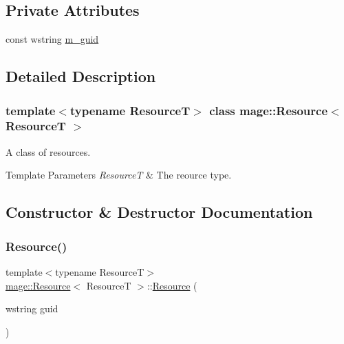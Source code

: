 \subsection*{Private Attributes}
\begin{DoxyCompactItemize}
\item 
const wstring \hyperlink{classmage_1_1_resource_ad2924d9bc9ddecf06475b52a8c7065d8}{m\+\_\+guid}
\end{DoxyCompactItemize}


\subsection{Detailed Description}
\subsubsection*{template$<$typename ResourceT$>$\newline
class mage\+::\+Resource$<$ Resource\+T $>$}

A class of resources.


\begin{DoxyTemplParams}{Template Parameters}
{\em ResourceT} & The reource type. \\
\hline
\end{DoxyTemplParams}


\subsection{Constructor \& Destructor Documentation}
\hypertarget{classmage_1_1_resource_aed55dc2f8700a2ba8123f3708948ed92}{}\label{classmage_1_1_resource_aed55dc2f8700a2ba8123f3708948ed92} 
\subsubsection{\texorpdfstring{Resource()}{Resource()}\hspace{0.1cm}{\footnotesize\ttfamily [1/3]}}
{\footnotesize\ttfamily template$<$typename ResourceT$>$ \\
\hyperlink{classmage_1_1_resource}{mage\+::\+Resource}$<$ ResourceT $>$\+::\hyperlink{classmage_1_1_resource}{Resource} (\begin{DoxyParamCaption}\item[{wstring}]{guid }\end{DoxyParamCaption})\hspace{0.3cm}{\ttfamily [explicit]}}

